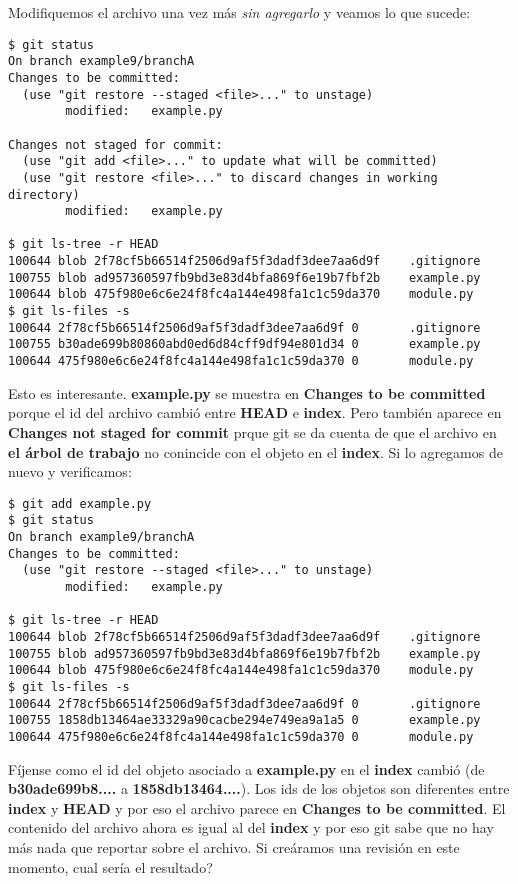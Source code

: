 Modifiquemos el archivo una vez más {\it sin agregarlo} y veamos lo que sucede:

\begin{lstlisting}[style=console_style,
	basicstyle=\small,
	caption=Luego de modificar un archivo ya {\bf agregado}]
$ git status
On branch example9/branchA
Changes to be committed:
  (use "git restore --staged <file>..." to unstage)
        modified:   example.py

Changes not staged for commit:
  (use "git add <file>..." to update what will be committed)
  (use "git restore <file>..." to discard changes in working directory)
        modified:   example.py

$ git ls-tree -r HEAD
100644 blob 2f78cf5b66514f2506d9af5f3dadf3dee7aa6d9f    .gitignore
100755 blob ad957360597fb9bd3e83d4bfa869f6e19b7fbf2b    example.py
100644 blob 475f980e6c6e24f8fc4a144e498fa1c1c59da370    module.py
$ git ls-files -s
100644 2f78cf5b66514f2506d9af5f3dadf3dee7aa6d9f 0       .gitignore
100755 b30ade699b80860abd0ed6d84cff9df94e801d34 0       example.py
100644 475f980e6c6e24f8fc4a144e498fa1c1c59da370 0       module.py
\end{lstlisting}

Esto es interesante. {\bf example.py} se muestra en {\bf Changes to be committed} porque el id del archivo cambió
entre {\bf HEAD} e {\bf index}. Pero también aparece en {\bf Changes not staged for commit} prque git se da cuenta de que
el archivo en {\bf el árbol de trabajo} no conincide con el objeto en el {\bf index}. Si lo agregamos de nuevo y verificamos:

\begin{lstlisting}[style=console_style,
	basicstyle=\small,
	caption=Luego de agregar el archivo de nuevo]
$ git add example.py 
$ git status
On branch example9/branchA
Changes to be committed:
  (use "git restore --staged <file>..." to unstage)
        modified:   example.py

$ git ls-tree -r HEAD
100644 blob 2f78cf5b66514f2506d9af5f3dadf3dee7aa6d9f    .gitignore
100755 blob ad957360597fb9bd3e83d4bfa869f6e19b7fbf2b    example.py
100644 blob 475f980e6c6e24f8fc4a144e498fa1c1c59da370    module.py
$ git ls-files -s
100644 2f78cf5b66514f2506d9af5f3dadf3dee7aa6d9f 0       .gitignore
100755 1858db13464ae33329a90cacbe294e749ea9a1a5 0       example.py
100644 475f980e6c6e24f8fc4a144e498fa1c1c59da370 0       module.py
\end{lstlisting}

Fíjense como el id del objeto asociado a {\bf example.py} en el {\bf index} cambió (de
{\bf b30ade699b8....} a {\bf 1858db13464....}). Los ids de los objetos son diferentes entre {\bf index} y {\bf HEAD }
y por eso el archivo parece en {\bf Changes to be committed}. El contenido del archivo ahora es igual al del {\bf index}
y por eso git sabe que no hay más nada que reportar sobre el archivo. Si creáramos una revisión en este momento, cual
sería el resultado?

